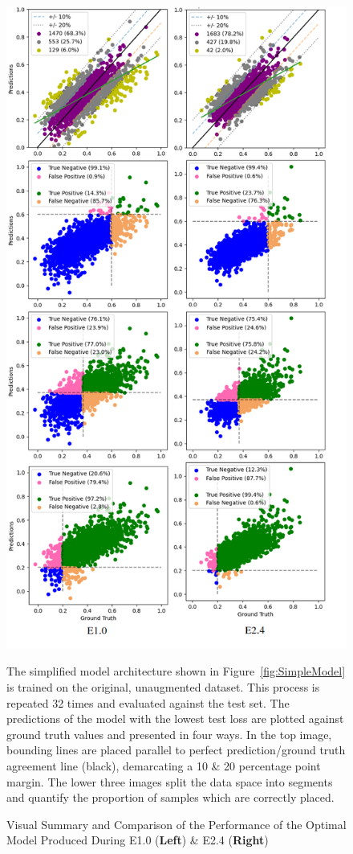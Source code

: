 \begin{figure}[p]
	\centering
	\includegraphics[scale=0.275]{Figures/E1p0_vs_E2p4.png}
	\caption{Visual Summary and Comparison of the Performance of the Optimal Model Produced During E1.0 (\textbf{Left}) \& E2.4 (\textbf{Right})} {The simplified model architecture shown in Figure~\ref{fig:SimpleModel} is trained on the original, unaugmented dataset. This process is repeated 32 times and evaluated against the test set. The predictions of the model with the lowest test loss are plotted against ground truth values and presented in four ways. In the top image, bounding lines are placed parallel to perfect prediction/ground truth agreement line (black), demarcating a 10 \& 20 percentage point margin. The lower three images split the data space into segments and quantify the proportion of samples which are correctly placed.}
	\label{fig:E1p0_vs_E2p4}
\end{figure}

